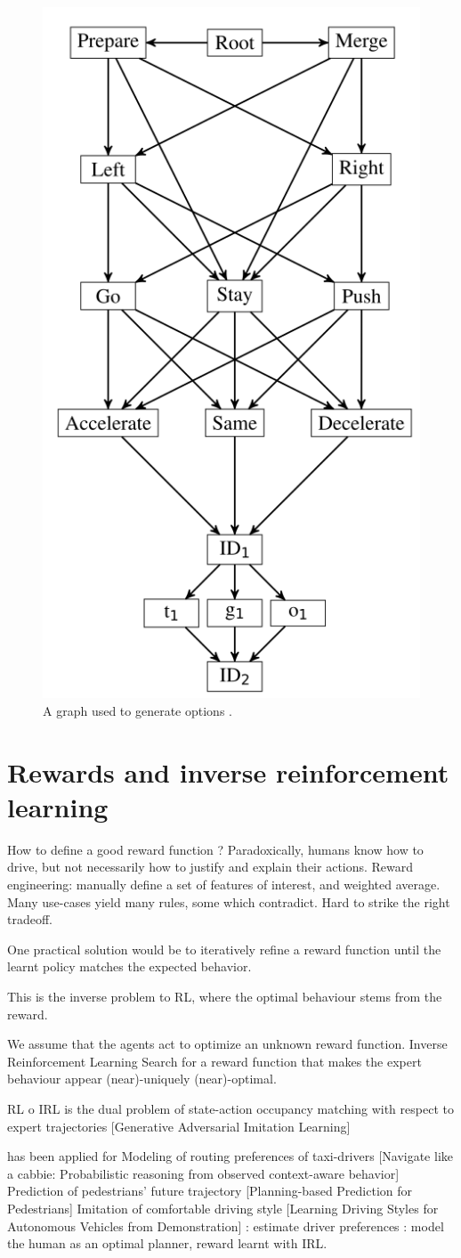 \begin{figure}[th]
	\centering
	\includegraphics[width=0.3\linewidth]{img/options}
	\caption{A graph used to generate options \citep{ShalevShwartz2016}.}
	\label{fig:options-graph}
\end{figure}

\section{Rewards and inverse reinforcement learning}

How to define a good reward function ?
Paradoxically, humans know how to drive, but not necessarily how to justify and explain their actions.
Reward engineering: manually define a set of features of interest, and weighted average. Many use-cases yield many rules, some which contradict. Hard to strike the right tradeoff.

One practical solution would be to iteratively refine a reward function until the learnt policy matches the expected behavior.

This is the inverse problem to RL, where the optimal behaviour stems from the reward.

We assume that the agents act to optimize an unknown reward function.
Inverse Reinforcement Learning
Search for a reward function that makes the expert behaviour appear (near)-uniquely (near)-optimal.

RL o IRL is the dual problem of state-action occupancy matching with respect to expert trajectories [Generative Adversarial Imitation Learning]


has been applied for
Modeling of routing preferences of taxi-drivers [Navigate like a cabbie: Probabilistic reasoning from observed context-aware behavior]
Prediction of pedestrians’ future trajectory [Planning-based Prediction for Pedestrians]
Imitation of comfortable driving style [Learning Driving Styles for Autonomous Vehicles from
Demonstration]
\citep{Sun2019}: estimate driver preferences
\citep{Sadigh2016}: model the human as an optimal planner, reward learnt with IRL.


